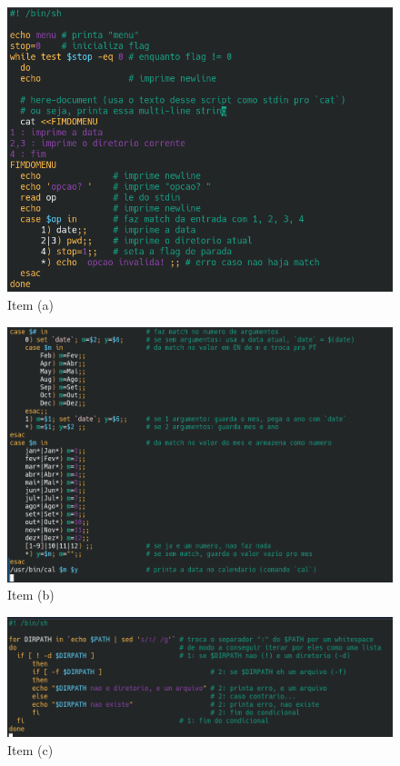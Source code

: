 \documentclass{article}
\begin{document}
\begin{figure}[!ht]
    \begin{center}
        \includegraphics[width=\textwidth]{images/q5_a.png}
        \caption{Item (a)}
    \end{center}
\end{figure}

\begin{figure}[!ht]
    \begin{center}
        \includegraphics[width=\textwidth]{images/q5_b.png}
        \caption{Item (b)}
    \end{center}
\end{figure}

\begin{figure}[!ht]
    \begin{center}
        \includegraphics[width=\textwidth]{images/q5_c.png}
        \caption{Item (c)}
    \end{center}
\end{figure}
\end{document}
